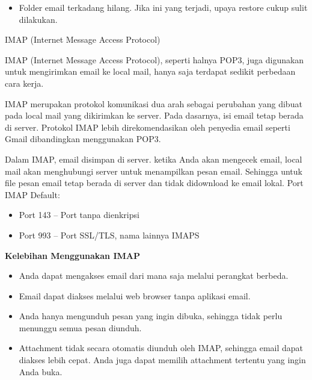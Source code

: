 \documentclass{wileySix}
\begin{document}
\begin{myEnumerate}
\begin{itemize}
		\noindent 
		\item Folder email terkadang hilang. Jika ini yang terjadi, upaya restore cukup sulit dilakukan.\end{itemize}
	\par
	\noindent 
	\item IMAP (Internet Message Access Protocol) \par
	IMAP (Internet Message Access Protocol), seperti halnya POP3, juga digunakan untuk mengirimkan email ke local mail, hanya saja terdapat sedikit perbedaan cara kerja. \par
	\vspace{12pt}
	IMAP merupakan protokol komunikasi dua arah sebagai perubahan yang dibuat pada local mail yang dikirimkan ke server. Pada dasarnya, isi email tetap berada di server. Protokol IMAP lebih direkomendasikan oleh penyedia email seperti Gmail dibandingkan menggunakan POP3. \par
	\vspace{12pt}
	Dalam IMAP, email disimpan di server. ketika Anda akan mengecek email, local mail akan menghubungi server untuk menampilkan pesan email. Sehingga untuk file pesan email tetap berada di server dan tidak didownload ke email lokal. Port IMAP Default: \par
	\noindent 
	\begin{itemize}
		\item Port 143 – Port tanpa dienkripsi \par
		\noindent 
		\item Port 993 – Port SSL/TLS, nama lainnya IMAPS\end{itemize}
	\par
	\vspace{12pt}
	\textbf{Kelebihan Menggunakan IMAP} \par
	\noindent 
	\begin{itemize}
		\item Anda dapat mengakses email dari mana saja melalui perangkat berbeda. \par
		\noindent 
		\item Email dapat diakses melalui web browser tanpa aplikasi email. \par
		\noindent 
		\item Anda hanya mengunduh pesan yang ingin dibuka, sehingga tidak perlu menunggu semua pesan diunduh. \par
		\noindent 
		\item Attachment tidak secara otomatis diunduh oleh IMAP, sehingga email dapat diakses lebih cepat. Anda juga dapat memilih attachment tertentu yang ingin Anda buka.\end{itemize}

\end{myEnumerate}
\end{document}
